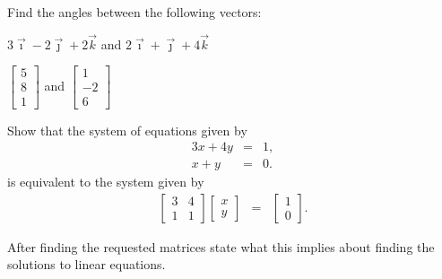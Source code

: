   \begin{problem}

  \item Find the angles between the following vectors:

    \begin{subproblem}
      \item $3\vec{\imath} - 2\vec{\jmath} + 2\vec{k}$ 
        and $2\vec{\imath} + \vec{\jmath}  + 4\vec{k}$
        \vfill

      \item $\left[\begin{array}{r} 5 \\  8 \\ 1 \end{array}\right]$
        and $\left[\begin{array}{r} 1 \\ -2 \\ 6 \end{array}\right]$
        \vfill

    \end{subproblem}

    \clearpage

  \item Show that the system of equations given by
    \begin{eqnarray*}
      3x + 4y & = & 1, \\
      x + y   & = & 0.
    \end{eqnarray*}
    is equivalent to the system given by
  \begin{eqnarray*}
    \left[
      \begin{array}{rr}
        3 & 4 \\ 
        1 & 1
      \end{array}
    \right] 
    \left[
      \begin{array}{r}
        x \\
        y
      \end{array}
    \right]
    & = & 
    \left[
      \begin{array}{r}
        1 \\
        0
      \end{array}
    \right].
  \end{eqnarray*}


    \vfill

    \clearpage

  \item After finding the requested matrices state what this implies
    about finding the solutions to linear equations.


\end{problem}

